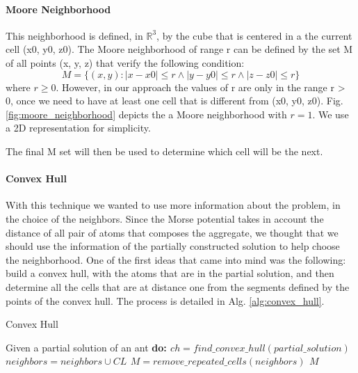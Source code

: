 		\paragraph*{Moore Neighborhood}
			This neighborhood is defined, in $\mathbb{R}^3$, by the cube that is centered in a the current cell (x0, y0, z0). The Moore neighborhood of range r can be defined by the set M of all points (x, y, z) that verify the following condition:
			\begin{equation}
				M= \{(x,y):|x-x0| \leq r \wedge |y-y0| \leq r \wedge |z-z0| \leq r\}
			\end{equation}
			where $r \geq 0$. However, in our approach the values of r are only in the range r > 0, once we need to have at least one cell that is different from (x0, y0, z0). Fig. \ref{fig:moore_neighborhood} depicts the a Moore neighborhood with $r = 1$. We use a 2D representation for simplicity. 
			
			
			The final M set will then be used to determine which cell will be the next.
			
			\paragraph*{Convex Hull}
			With this technique we wanted to use more information about the problem, in the choice of the neighbors. Since the Morse potential takes in account the distance of all pair of atoms that composes the aggregate, we thought that we should use the information of the partially constructed solution to help choose the neighborhood. One of the first ideas that came into mind was the following: build a convex hull, with the atoms that are in the partial solution, and then determine all the cells that are at distance one from the segments defined by the points of the convex hull. The process is detailed in Alg. \ref{alg:convex_hull}.
			\begin{algorithm}
				\caption{Convex Hull}
				\label{alg:convex_hull}
				\begin{algorithmic}
				\STATE Given a partial solution of an ant \bf{do}:
				\STATE $ch = find\_convex\_hull(partial\_solution)$
							\STATE $neighbors = neighbors \cup CL$
						\ENDIF
					\ENDFOR
				\ENDFOR
				\STATE $M = remove\_repeated\_cells(neighbors)$
				\RETURN $M$
				\end{algorithmic}
			\end{algorithm}
			

